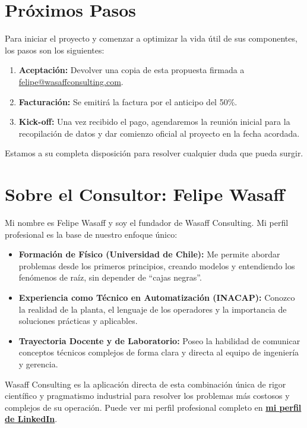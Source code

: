 \documentclass[11pt, a4paper]{article}
\begin{document}
\section{Próximos Pasos}
Para iniciar el proyecto y comenzar a optimizar la vida útil de sus componentes, los pasos son los siguientes:
\begin{enumerate}
    \item \textbf{Aceptación:} Devolver una copia de esta propuesta firmada a \href{mailto:felipe@wasaffconsulting.com}{felipe@wasaffconsulting.com}.
    \item \textbf{Facturación:} Se emitirá la factura por el anticipo del 50\%.
    \item \textbf{Kick-off:} Una vez recibido el pago, agendaremos la reunión inicial para la recopilación de datos y dar comienzo oficial al proyecto en la fecha acordada.
\end{enumerate}
Estamos a su completa disposición para resolver cualquier duda que pueda surgir.

\section{Sobre el Consultor: Felipe Wasaff}
Mi nombre es Felipe Wasaff y soy el fundador de Wasaff Consulting. Mi perfil profesional es la base de nuestro enfoque único:
\begin{itemize}
    \item \textbf{Formación de Físico (Universidad de Chile):} Me permite abordar problemas desde los primeros principios, creando modelos y entendiendo los fenómenos de raíz, sin depender de ``cajas negras''.
    \item \textbf{Experiencia como Técnico en Automatización (INACAP):} Conozco la realidad de la planta, el lenguaje de los operadores y la importancia de soluciones prácticas y aplicables.
    \item \textbf{Trayectoria Docente y de Laboratorio:} Poseo la habilidad de comunicar conceptos técnicos complejos de forma clara y directa al equipo de ingeniería y gerencia.
\end{itemize}
Wasaff Consulting es la aplicación directa de esta combinación única de rigor científico y pragmatismo industrial para resolver los problemas más costosos y complejos de su operación. Puede ver mi perfil profesional completo en \href{https://www.linkedin.com/in/tu-perfil/}{\textbf{mi perfil de LinkedIn}}.
\end{document}
